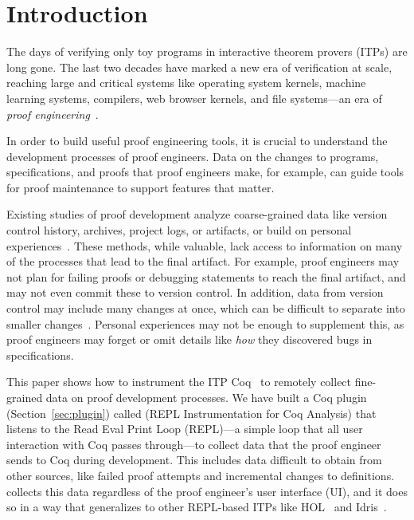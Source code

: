 \section{Introduction}

The days of verifying only toy programs in interactive theorem provers
(ITPs) are long gone.
The last two decades have marked a new era of verification at scale,
reaching large and critical systems like operating system kernels,
machine learning systems, compilers, web browser kernels, and 
file systems---an era of \textit{proof engineering}~\cite{PGL-045}.

In order to build useful proof engineering tools,
it is crucial to understand the development processes of proof engineers.
Data on the changes to programs, specifications, 
and proofs that proof engineers make,
for example, can guide tools for proof maintenance to support
features that matter.

Existing studies of proof development analyze coarse-grained data like
version control history, archives, project logs, or %
artifacts, or build on personal experiences~\cite{Andronick2012, Zhang2012,
Staples2014, Blanchette2015, Staples2013, Matichuk2015, Wiedijk2009,
Aspinall2016, Bourke12, Woos2016}.
These methods, while valuable, lack access to information on
many of the processes that lead to the final artifact.
For example, proof engineers may not plan for failing proofs or debugging
statements to reach the final artifact, and may not even commit
these to version control.
In addition, data from version control may include
many changes at once, which
can be difficult to separate into smaller changes~\cite{Ringer2018}.
Personal experiences may not be enough to supplement
this, as proof engineers may forget or omit 
details like \emph{how} they discovered bugs in specifications.

This paper shows how to instrument the ITP Coq~\cite{coq} to remotely collect
fine-grained data on proof development processes.
We have built a Coq plugin (Section~\ref{sec:plugin}) called \toolname 
(REPL Instrumentation for Coq Analysis) that listens to the Read Eval Print
Loop (REPL)---a simple loop that all user interaction with Coq passes through---to collect data that the proof engineer sends to Coq during development.
This includes data difficult to obtain from other sources, like failed
proof attempts and incremental changes to definitions. 
\toolname collects this data regardless of the proof engineer's 
user interface (UI), and it does so in a way that
generalizes to other REPL-based ITPs like 
HOL~\cite{hol-interact, hol4-interact} and Idris~\cite{idris-repl}.

